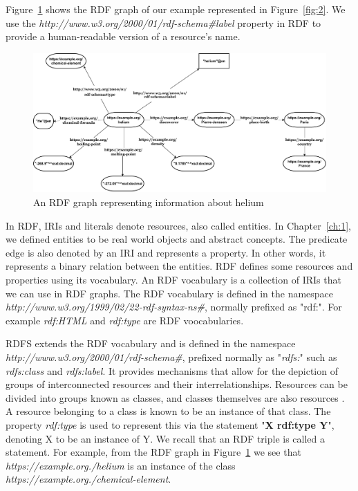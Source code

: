 Figure~\ref{fig:4} shows the RDF graph of our example represented in Figure~\ref{fig:2}. We use the \textit{http://www.w3.org/2000/01/rdf-schema\#label} property in RDF to provide a human-readable version of a resource's name.

\begin{figure}[h]
  \centering
  \includegraphics[width=0.75 \linewidth]{images/rdf_graph_updated.drawio.pdf}
  \caption{An RDF graph representing information about helium}
  \label{fig:4}
\end{figure}

In RDF, IRIs and literals denote resources, also called entities. In Chapter~\ref{ch:1}, we defined entities to be real world objects and abstract concepts. The predicate edge is also denoted by an IRI and represents a property. In other words, it represents a binary relation between the entities. RDF defines some resources and properties using its vocabulary. An RDF vocabulary is a collection of IRIs that we can use in RDF graphs. The RDF vocabulary is defined in the namespace \textit{http://www.w3.org/1999/02/22-rdf-syntax-ns\#}, normally prefixed as "rdf:". For example \textit{rdf:HTML} and \textit{rdf:type} are RDF voocabularies.

RDFS extends the RDF vocabulary and is defined in the namespace \textit{http://www.w3.org/2000/01/rdf-schema\#}, prefixed normally as "\textit{rdfs:}" such as \textit{rdfs:class} and \textit{rdfs:label}. It provides mechanisms that allow for the depiction of groups of interconnected resources and their interrelationships. Resources can be divided into groups known as classes, and classes themselves are also resources \cite{Brickley2014}. A resource belonging to a class is known to be an instance of that class. The property \textit{rdf:type} is used to represent this via the statement "\textbf{X rdf:type Y}", denoting X to be an instance of Y. We recall that an RDF triple is called a statement. For example, from the RDF graph in Figure~\ref{fig:4} we see that \textit{https://example.org./helium} is an instance of the class \textit{https://example.org./chemical-element}. 


